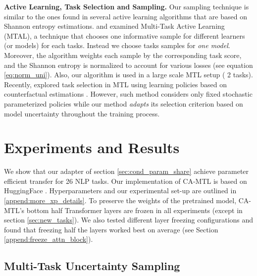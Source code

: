 \documentclass{article} \usepackage{iclr2021_conference,times}
\begin{document}
\textbf{Active Learning, Task Selection and Sampling.}
Our sampling technique is similar to the ones found in several active learning algorithms \citep{chen-etal-2006-empirical-study} that are based on Shannon entropy estimations. \citet{reichart2008multi} and \citet{ikhwantri2018multi} examined Multi-Task Active Learning (MTAL), a technique that chooses one informative sample for  different learners (or models) for each  tasks. Instead we choose  tasks samples for \emph{one model}.
Moreover, the algorithm weights each sample by the corresponding task score, and the Shannon entropy is normalized to account for various losses (see equation \ref{eq:norm_uni}). Also, our algorithm is used in a large scale MTL setup ( 2 tasks). Recently, \citet{DBLP:journals/corr/abs-1907-06214}  explored task selection in MTL using learning policies based on counterfactual estimations \citep{charles2013counterfactual}. However, such method considers only fixed stochastic parameterized policies while our method \emph{adapts} its selection criterion based on model uncertainty throughout the training process.






\section{Experiments and Results}

We show that our adapter of section \ref{sec:cond_param_share} achieve parameter efficient transfer for 26 NLP tasks. 
Our implementation of CA-MTL is based on HuggingFace \citep{huggingface}. Hyperparameters and our experimental set-up are outlined in \ref{append:more_xp_details}. To preserve the weights of the pretrained model, CA-MTL's bottom half Transformer layers are frozen in all experiments (except in section \ref{sec:new_tasks}). We also tested different layer freezing configurations and found that freezing half the layers worked best on average (see Section \ref{append:freeze_attn_block}).

\subsection{Multi-Task Uncertainty Sampling}
\label{sec:mt-uncert-xp}
\end{document}
